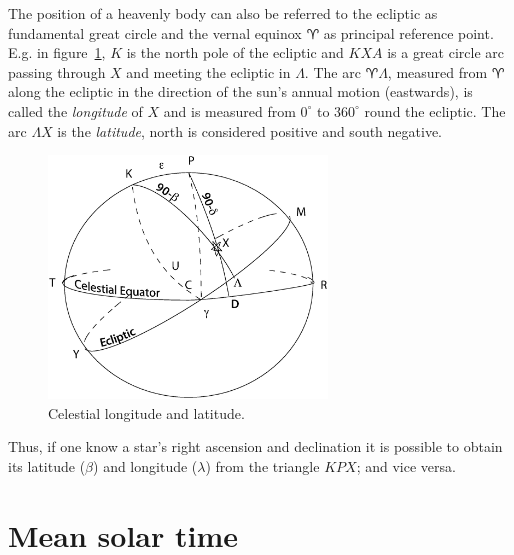 The position of a heavenly body can also be referred to the ecliptic
as fundamental great circle and the vernal equinox $\aries$ as principal
reference point. E.g. in figure~\ref{fig:ecliptic}, $K$ is the north pole
of the ecliptic and $KXA$ is a great circle arc passing through $X$
and meeting the ecliptic in $\Lambda$. The arc $\aries\Lambda$,
measured from $\aries$ along the ecliptic in the direction of the
sun's annual motion (eastwards), is called the {\it longitude} of $X$
and is measured from $0^\circ$ to $360^\circ$ round the ecliptic. The
arc $\Lambda X$ is the {\it latitude}, north is considered positive
and south negative. 
%
\begin{figure}[h]
	\centering
	\includegraphics[width=0.66\textwidth]{ecliptic.eps}
	\caption{Celestial longitude and latitude.}
	\label{fig:ecliptic}
\end{figure}
%
Thus, if one know a star's right ascension and declination it is
possible to obtain its latitude ($\beta$) and longitude ($\lambda$)
from the triangle $KPX$; and vice versa.

%
\section{Mean solar time}

